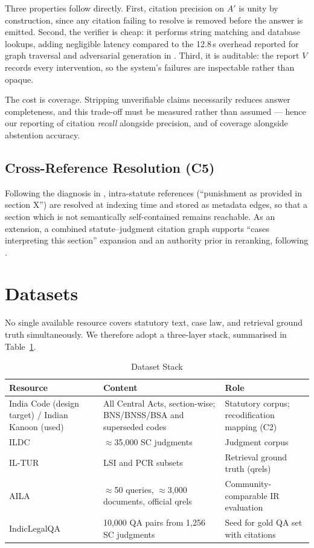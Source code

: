 \documentclass[conference]{IEEEtran}
\begin{document}
Three properties follow directly. First, citation precision on $A'$ is unity by construction, since any citation failing to resolve is removed before the answer is emitted. Second, the verifier is cheap: it performs string matching and database lookups, adding negligible latency compared to the 12.8\,s overhead reported for graph traversal and adversarial generation in \cite{bindra2026}. Third, it is auditable: the report $V$ records every intervention, so the system's failures are inspectable rather than opaque.

The cost is coverage. Stripping unverifiable claims necessarily reduces answer completeness, and this trade-off must be measured rather than assumed — hence our reporting of citation \emph{recall} alongside precision, and of coverage alongside abstention accuracy.

\subsection{Cross-Reference Resolution (C5)}

Following the diagnosis in \cite{rustamov2025}, intra-statute references (``punishment as provided in section X'') are resolved at indexing time and stored as metadata edges, so that a section which is not semantically self-contained remains reachable. As an extension, a combined statute--judgment citation graph supports ``cases interpreting this section'' expansion and an authority prior in reranking, following \cite{bindra2026}.

\section{Datasets}
\label{sec:data}

No single available resource covers statutory text, case law, and retrieval ground truth simultaneously. We therefore adopt a three-layer stack, summarised in Table~\ref{tab:data}.

\begin{table}[t]
\caption{Dataset Stack}
\label{tab:data}
\centering
\footnotesize
\begin{tabular}{@{}p{1.9cm}p{2.4cm}p{2.9cm}@{}}
\toprule
\textbf{Resource} & \textbf{Content} & \textbf{Role} \\
\midrule
India Code (design target) / Indian Kanoon (used) & All Central Acts, section-wise; BNS/BNSS/BSA and superseded codes & Statutory corpus; recodification mapping (C2) \\
\addlinespace
ILDC \cite{malik2021} & $\approx$35{,}000 SC judgments & Judgment corpus \\
\addlinespace
IL-TUR \cite{joshi2024} & LSI and PCR subsets & Retrieval ground truth (qrels) \\
\addlinespace
AILA \cite{bhattacharya2019} & $\approx$50 queries, $\approx$3{,}000 documents, official qrels & Community-comparable IR evaluation \\
\addlinespace
IndicLegalQA & 10{,}000 QA pairs from 1{,}256 SC judgments & Seed for gold QA set with citations \\
\bottomrule
\end{tabular}
\end{table}
\end{document}
